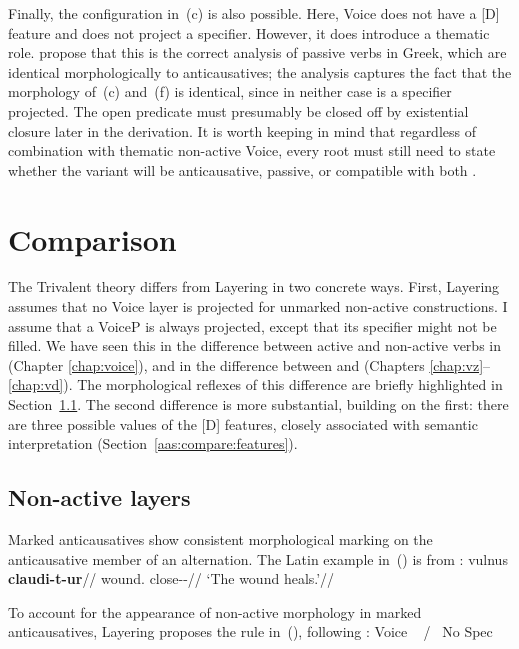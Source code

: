 Finally, the configuration in~(\lastx c) is also possible. Here, Voice does not have a [D] feature and does not project a specifier. However, it does introduce a thematic role. \cite{layering15} propose that this is the correct analysis of passive verbs in Greek, which are identical morphologically to anticausatives; the analysis captures the fact that the morphology of~(\lastx c) and~(\lastx f) is identical, since in neither case is a specifier projected. The open predicate must presumably be closed off by existential closure later in the derivation. It is worth keeping in mind that regardless of combination with thematic non-active Voice, every root must still need to state whether the  variant will be anticausative, passive, or compatible with both \citep[88]{alexiadouanagnostopoulou04,layering15}.


\section{Comparison} \label{aas:compare}
The Trivalent theory differs from Layering in two concrete ways. First, Layering assumes that no Voice layer is projected for unmarked non-active constructions. I assume that a VoiceP is always projected, except that its specifier might not be filled. We have seen this in the difference between active and non-active verbs in {\tkal} (Chapter \ref{chap:voice}), and in the difference between {\vz} and {\vd} (Chapters \ref{chap:vz}--\ref{chap:vd}). The morphological reflexes of this difference are briefly highlighted in Section~\ref{aas:compare:vi-nact}. The second difference  is more substantial, building on the first: there are three possible values of the [D] features, closely associated with semantic interpretation (Section~\ref{aas:compare:features}).

	\subsection{Non-active layers} \label{aas:compare:vi-nact}
Marked anticausatives show consistent morphological marking on the anticausative member of an alternation. The Latin example in~(\nextx) is from \citet[662]{kastnerzu17}:
\ex \begingl
	\gla vulnus \textbf{claudi-t-ur}//
	\glb wound. close--//
	\glft `The wound heals.'//
	\endgl
\xe

To account for the appearance of non-active morphology in marked anticausatives, Layering proposes the rule in~(\nextx), following \cite{embick04}:
\ex\label{ex:aas:vi-nact}Voice \lra~ / \trace~No Spec
\xe

